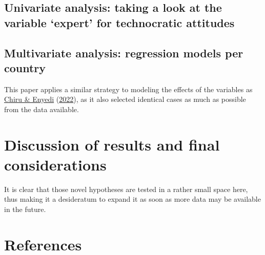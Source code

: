 \documentclass[
  12pt,
  english,
]{article}
\begin{document}
\hypertarget{univariate-analysis-taking-a-look-at-the-variable-expert-for-technocratic-attitudes}{%
\subsection{Univariate analysis: taking a look at the variable `expert'
for technocratic
attitudes}\label{univariate-analysis-taking-a-look-at-the-variable-expert-for-technocratic-attitudes}}

\hypertarget{multivariate-analysis-regression-models-per-country}{%
\subsection{Multivariate analysis: regression models per
country}\label{multivariate-analysis-regression-models-per-country}}

This paper applies a similar strategy to modeling the effects of the
variables as \protect\hyperlink{ref-chiru2022wants}{Chiru \& Enyedi}
(\protect\hyperlink{ref-chiru2022wants}{2022}), as it also selected
identical cases as much as possible from the data available.

\hypertarget{discussion-of-results-and-final-considerations}{%
\section{Discussion of results and final
considerations}\label{discussion-of-results-and-final-considerations}}

It is clear that those novel hypotheses are tested in a rather small
space here, thus making it a desideratum to expand it as soon as more
data may be available in the future.

\newpage{}

\hypertarget{references}{%
\section{References}\label{references}}
\end{document}

